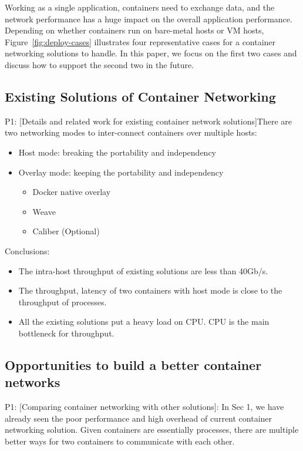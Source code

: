 Working as a single application, containers need to exchange data, and the network performance has a huge impact on the overall application performance.
Depending on whether 
containers run on bare-metal hosts or VM hosts, Figure~\ref{fig:deploy-cases}
illustrates four representative cases for a container networking solutions
to handle. 
In this paper, 
we focus on the first two cases and discuss how to support the second two
in the future.


\subsection{Existing Solutions of Container Networking}

P1: [Details and related work for existing container network solutions]There are two networking modes to inter-connect containers over multiple hosts:

\begin{itemize}
  \item Host mode: breaking the portability and independency
  \item Overlay mode: keeping the portability and independency
  \begin{itemize}
  \item Docker native overlay
  \item Weave
  \item Caliber (Optional)
  \end{itemize}  
\end{itemize}


Conclusions:
\begin{itemize}
  \item The intra-host throughput of existing solutions are less than 40Gb/s.
  \item The throughput, latency of two containers with host mode is close to the throughput of processes.
  \item All the existing solutions put a heavy load on CPU. CPU is the main bottleneck for throughput.
\end{itemize}

\subsection{Opportunities to build a better container networks}
P1: [Comparing container networking with other solutions]: In Sec 1, we have already seen the poor performance and high overhead of current container networking solution. Given containers are essentially processes, there are multiple better ways for two containers to communicate with each other.

